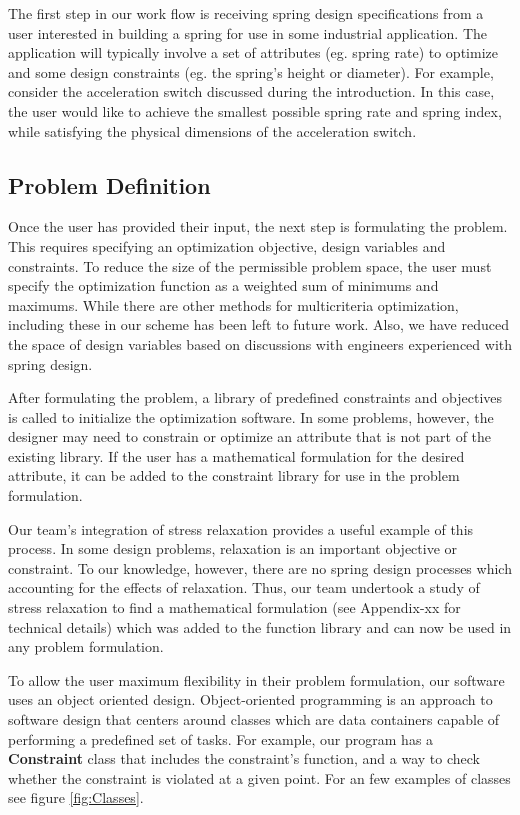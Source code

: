 \documentclass[10pt]{article}
\begin{document}
The first step in our work flow is receiving spring design specifications from a user interested in building a spring for use in some industrial application.  The application will typically involve a set of attributes (eg. spring rate) to optimize and some design constraints (eg. the spring's height or diameter).  For example, consider the acceleration switch discussed during the introduction.  In this case, the user would like to achieve the smallest possible spring rate and spring index, while satisfying the physical dimensions of the acceleration switch.

\subsection{Problem Definition}
\label{sec:Problem_Definition}

Once the user has provided their input, the next step is formulating the problem.  This requires specifying an optimization objective, design variables and constraints.  To reduce the size of the permissible problem space, the user must specify the optimization function as a weighted sum of minimums and maximums.  While there are other methods for multicriteria optimization, including these in our scheme has been left to future work.  Also, we have reduced the space of design variables based on discussions with engineers experienced with spring design.

After formulating the problem, a library of predefined constraints and objectives is called to initialize the optimization software.  In some problems, however, the designer may need to constrain or optimize an attribute that is not part of the existing library.  If the user has a mathematical formulation for the desired attribute, it can be added to the constraint library for use in the problem formulation.

Our team's integration of stress relaxation provides a useful example of this process.  In some design problems, relaxation is an important objective or constraint.  To our knowledge, however, there are no spring design processes which accounting for the effects of relaxation.  Thus, our team undertook a study of stress relaxation to find a mathematical formulation (see Appendix-xx for technical details) which was added to the function library and can now be used in any problem formulation.

To allow the user maximum flexibility in their problem formulation, our software uses an object oriented design.  Object-oriented programming is an approach to software design that centers around classes which are data containers capable of performing a predefined set of tasks.  For example, our program has a \textbf{Constraint} class that includes the constraint's function, and a way to check whether the constraint is violated at a given point. For an few examples of classes see figure \ref{fig:Classes}. 
\end{document}
